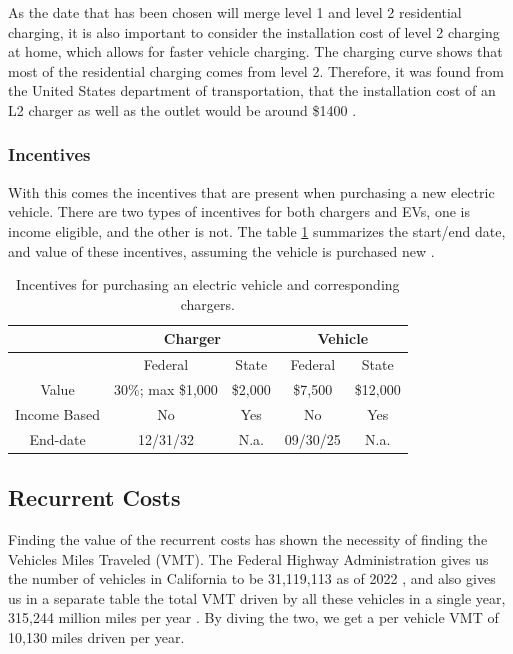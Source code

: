 \documentclass{article}
\begin{document}
As the date that has been chosen will merge level 1 and level 2 residential charging, it is also important to consider the installation cost of level 2 charging at home, which allows for faster vehicle charging. The charging curve shows that most of the residential charging comes from level 2. Therefore, it was found from the United States department of transportation, that the installation cost of an L2 charger as well as the outlet would be around \$1400 \cite{L2ChargerCost}.

\subsubsection{Incentives}

With this comes the incentives that are present when purchasing a new electric vehicle. There are two types of incentives for both chargers and EVs, one is income eligible, and the other is not. The table \ref{EV Incentives} summarizes the start/end date, and value of these incentives, assuming the vehicle is purchased new \cite{DriveClean}.

\begin{table}[H]
    \centering
    \begin{tabular}{|c|c|c|c|c|}\hline
         &  \multicolumn{2}{|c|}{Charger}&  \multicolumn{2}{|c|}{Vehicle} \\\hline
         &  Federal&  State&  Federal& State\\\hline
         Value&  30\%; max \$1,000&  \$2,000&  \$7,500& \$12,000\\\hline
 Income Based& No& Yes& No&Yes\\\hline
         End-date&  12/31/32&  N.a.&  09/30/25& N.a.\\ \hline
    \end{tabular}
    \caption{Incentives for purchasing an electric vehicle and corresponding chargers.}
    \label{EV Incentives}
\end{table}

\subsection{Recurrent Costs}

Finding the value of the recurrent costs has shown the necessity of finding the Vehicles Miles Traveled (VMT). The Federal Highway Administration gives us the number of vehicles in California to be 31,119,113 as of 2022 \cite{NumberVehiclesCalifornia}, and also gives us in a separate table the total VMT driven by all these vehicles in a single year, 315,244 million miles per year \cite{TotalVMTCalifornia}. By diving the two, we get a per vehicle VMT of 10,130 miles driven per year.
\end{document}
